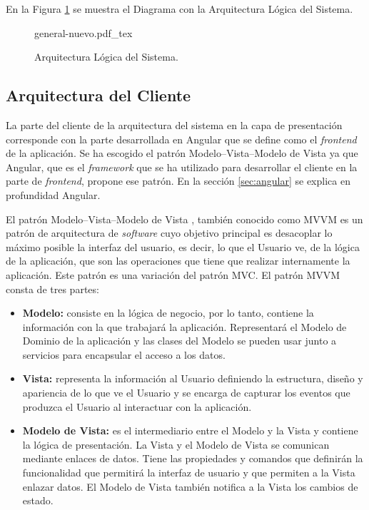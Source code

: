 En la Figura \ref{fig:arquitectura-logica} se muestra el Diagrama con la Arquitectura Lógica del Sistema.

\begin{figure}
    \centering
    \begin{normalsize}
        {general-nuevo.pdf_tex}
    \end{normalsize}
    \caption{Arquitectura Lógica del Sistema.}
     \label{fig:arquitectura-logica}
 
 \end{figure}


\subsection{Arquitectura del Cliente}
La parte del cliente de la arquitectura del sistema en la capa de presentación corresponde con la parte desarrollada en Angular que se define como el \textit{frontend} de la aplicación.
Se ha escogido el patrón Modelo–Vista–Modelo de Vista ya que Angular, que es el \textit{framework} que se ha utilizado para desarrollar el cliente en la parte de \textit{frontend}, propone ese patrón. En la sección \ref{sec:angular} se explica en profundidad Angular.



El patrón Modelo–Vista–Modelo de Vista \cite{mvvm}, también conocido como MVVM es un patrón de arquitectura de \textit{software} cuyo objetivo principal es desacoplar lo máximo posible la interfaz del usuario, es decir, lo que el Usuario ve, de la lógica de la aplicación, que son las operaciones que tiene que realizar internamente la aplicación. Este patrón es una variación del patrón MVC. El patrón MVVM consta de tres partes:

\begin{itemize}
    \item \textbf{Modelo:} consiste en la lógica de negocio, por lo tanto, contiene la información con la que trabajará la aplicación. Representará el Modelo de Dominio de la aplicación y las clases del Modelo se pueden usar junto a servicios para encapsular el acceso a los datos. 
    \item \textbf{Vista:} representa la información al Usuario definiendo la estructura, diseño y apariencia de lo que ve el Usuario y se encarga de capturar los eventos que produzca el Usuario al interactuar con la aplicación.
    \item \textbf{Modelo de Vista:} es el intermediario entre el Modelo y la Vista y contiene la lógica de presentación. La Vista y el Modelo de Vista se comunican mediante enlaces de datos. Tiene las propiedades y comandos que definirán la funcionalidad que permitirá la interfaz de usuario y que permiten a la Vista enlazar datos. El Modelo de Vista también notifica a la Vista los cambios de estado.
\end{itemize}

